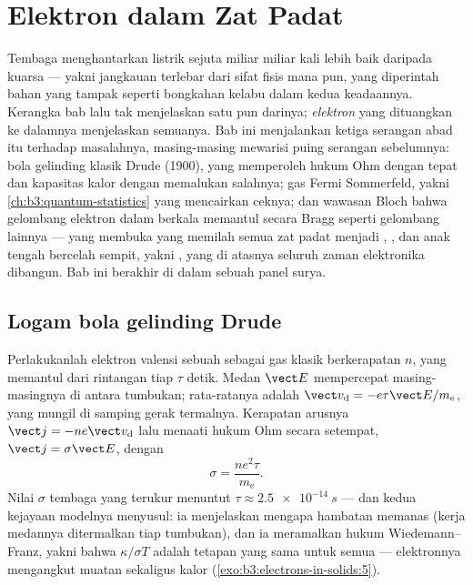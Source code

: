 \chapter{Elektron dalam Zat Padat}\label{ch:b3:electrons-in-solids}


Tembaga menghantarkan listrik sejuta miliar miliar kali lebih baik
daripada kuarsa --- yakni jangkauan terlebar dari sifat fisis mana pun,
yang diperintah bahan yang tampak seperti bongkahan kelabu dalam kedua
keadaannya. Kerangka bab lalu tak menjelaskan satu pun darinya;
\emph{elektron} yang dituangkan ke dalamnya menjelaskan semuanya. Bab
ini menjalankan ketiga serangan abad itu terhadap masalahnya,
masing-masing mewarisi puing serangan sebelumnya: bola gelinding klasik
Drude (1900), yang memperoleh hukum Ohm dengan tepat dan kapasitas kalor
dengan memalukan salahnya; gas Fermi Sommerfeld, yakni
\cref{ch:b3:quantum-statistics} yang mencairkan ceknya; dan wawasan
Bloch bahwa gelombang elektron dalam  berkala memantul secara Bragg
seperti gelombang lainnya --- yang membuka \emph{} yang memilah
semua zat padat menjadi , , dan anak tengah bercelah sempit,
yakni , yang di atasnya seluruh zaman elektronika dibangun.
Bab ini berakhir di dalam sebuah panel surya.

\section{Logam bola gelinding Drude}

\begin{proposition}\label{prop:b3:electrons-in-solids:drude}
Perlakukanlah elektron valensi sebuah  sebagai gas klasik berkerapatan $n$,
yang memantul dari rintangan tiap $\tau$ detik. Medan $\vect E$
mempercepat masing-masingnya di antara tumbukan; \emph{} rata-ratanya adalah $\vect v_{\text{d}} = -e\tau\vect E/m_{\text{e}}$,
yang mungil di samping gerak termalnya. Kerapatan arusnya $\vect j =
-ne\vect v_{\text{d}}$ lalu menaati hukum Ohm secara setempat,
$\vect j = \sigma\vect E$, dengan
\[
\sigma = \frac{ne^2\tau}{m_{\text{e}}} .
\]
Nilai $\sigma$ tembaga yang terukur menuntut $\tau \approx \qty{2.5e-14}{s}$
--- dan kedua kejayaan modelnya menyusul: ia menjelaskan mengapa
hambatan memanas (kerja medannya ditermalkan tiap tumbukan), dan ia
meramalkan hukum Wiedemann--Franz, yakni bahwa $\kappa/\sigma T$ adalah
tetapan yang sama untuk semua  --- elektronnya mengangkut muatan
sekaligus kalor (\cref{exo:b3:electrons-in-solids:5}).
\end{proposition}

